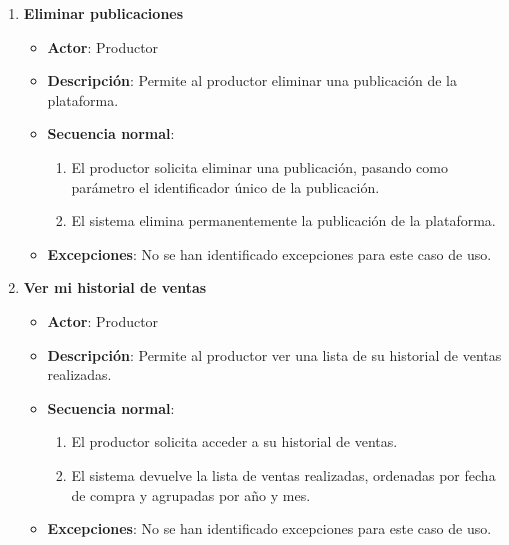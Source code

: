 \begin{enumerate}[label=UC-\protect\twodigits{\arabic*}:, align=left, leftmargin=*]
\item \textbf{Eliminar publicaciones}
\begin{itemize}
\item \textbf{Actor}: Productor
\item \textbf{Descripción}: Permite al productor eliminar una publicación de la plataforma.
\item \textbf{Secuencia normal}:
\begin{enumerate}[label={\arabic*}:]
\item El productor solicita eliminar una publicación, pasando como parámetro el identificador único de la publicación.
\item El sistema elimina permanentemente la publicación de la plataforma.
\end{enumerate}
\item \textbf{Excepciones}: No se han identificado excepciones para este caso de uso.
\end{itemize}


\item \textbf{Ver mi historial de ventas}
\begin{itemize}
\item \textbf{Actor}: Productor
\item \textbf{Descripción}: Permite al productor ver una lista de su historial de ventas realizadas.
\item \textbf{Secuencia normal}:
\begin{enumerate}[label={\arabic*}:]
\item El productor solicita acceder a su historial de ventas.
\item El sistema devuelve la lista de ventas realizadas, ordenadas por fecha de compra y agrupadas por año y mes.
\end{enumerate}
\item \textbf{Excepciones}: No se han identificado excepciones para este caso de uso.
\end{itemize}


\end{enumerate}
